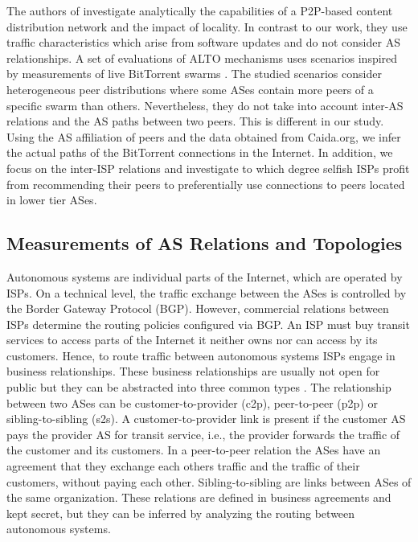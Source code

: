 The authors of \cite{gkantsidis2006planet} investigate analytically the capabilities of a P2P-based content distribution network and the impact of locality. In contrast to our work, they use traffic characteristics which arise from software updates and do not consider AS relationships.
A set of evaluations of ALTO mechanisms uses scenarios inspired by measurements of live BitTorrent swarms \cite{Cuevas2011,Blond2011,Lehrieder2011}. The studied scenarios consider heterogeneous peer distributions where some ASes contain more peers of a specific swarm than others. Nevertheless, they do not take into account inter-AS relations and the AS paths between two peers. This is different in our study. Using the AS affiliation of peers and the data obtained from Caida.org, we infer the actual paths of the BitTorrent connections in the Internet. In addition, we focus on the inter-ISP relations and investigate to which degree selfish ISPs profit from recommending their peers to preferentially use connections to peers located in lower tier ASes.

\subsection{Measurements of AS Relations and Topologies}

Autonomous systems are individual parts of the Internet, which are operated by ISPs.
On a technical level, the traffic exchange between the ASes is controlled by the Border Gateway Protocol (BGP)\cite{trangia2009}. However, commercial relations between ISPs determine the routing policies configured via BGP.
An ISP must buy transit services to access parts of the Internet it neither owns nor can access by its customers.
Hence, to route traffic between autonomous systems ISPs engage in business relationships.
These business relationships are usually not open for public but they can be abstracted into three common types \cite{gao2001}.
The relationship between two ASes can be customer-to-provider (c2p), peer-to-peer (p2p) or sibling-to-sibling (s2s).
A customer-to-provider link is present if the customer AS pays the provider AS for transit service, i.e., the provider forwards the traffic of the customer and its customers. In a peer-to-peer relation the ASes have an agreement that they exchange each others traffic and the traffic of their customers, without paying each other. Sibling-to-sibling are links between ASes of the same organization. These relations are defined in business agreements and kept secret, but they can be inferred by analyzing the routing between autonomous systems.

